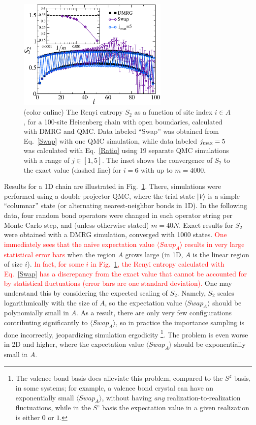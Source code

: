 \documentclass[prl,aps,twocolumn,floatfix,amsmath,amssymb,superscriptaddress,tightenlines]{revtex4}
\begin{document}
\begin{figure} {
\includegraphics[width=2.9in]{L100_fig2.eps} \caption{(color online) 
\label{1Dfig}
The Renyi entropy $S_2$ as a function of site index $i \in A$, for a 100-site Heisenberg chain with open boundaries, 
calculated with DMRG and QMC.  Data labeled ``Swap'' was obtained from Eq.~\eqref{Swap} with one QMC simulation, while
data labeled $j_{\rm max}=5$ was calculated with Eq.~\eqref{Ratio} using 19 separate QMC simulations with a range of  $j \in [1,5]$.  The inset shows the convergence of $S_2$ to the exact value (dashed line) for $i=6$ with up to $m=4000$.
}
} \end{figure}

Results for a 1D chain are illustrated in Fig.~\ref{1Dfig}.  There, simulations were performed using a double-projector QMC,  where
the trial state $| V \rangle$ is a simple ``columnar'' state (or alternating nearest-neighbor bonds in 1D).  In the following data, four random bond operators were changed in each operator string per Monte Carlo step, and (unless otherwise
stated) $m=40N$.  Exact results for $S_2$ were obtained with a DMRG simulation, converged with 1000 states.  
\textcolor{red}{One 
immediately sees that the naive expectation value $\langle Swap_A \rangle$ 
results in very large statistical error bars }
when the region
$A$ grows large (in 1D, $A$ is the linear region of size $i$).  
\textcolor{red}{ 
In fact, for some $i$ in Fig.~\ref{1Dfig}, the Renyi entropy calculated with Eq.~\eqref{Swap} has a discrepancy from the
exact value that cannot be accounted for by statistical fluctuations (error bars are one standard deviation).  
}
One may understand this 
by considering the expected scaling of $S_2$.  Namely,
$S_2$ scales logarithmically with the size of $A$, so the expectation value
$\langle Swap_A \rangle$ should be polynomially small in $A$.  As a result, there
are only very
few configurations contributing significantly to $\langle Swap_A \rangle$, so in practice the importance  sampling is done incorrectly,
jeopardizing simulation ergodicity \footnote{The valence bond basis does alleviate this problem, compared to the
$S^z$ basis, in some systems; for example, a valence
bond crystal can have an exponentially small $\langle Swap_A \rangle$, without having {\it any} realization-to-realization fluctuations,
while in the $S^z$ basis the expectation value  in a given realization is either $0$ or $1$.}.
The problem is even worse in 2D and higher, where the expectation value 
$\langle Swap_A \rangle$ should be exponentially small in $A$.
\end{document}
